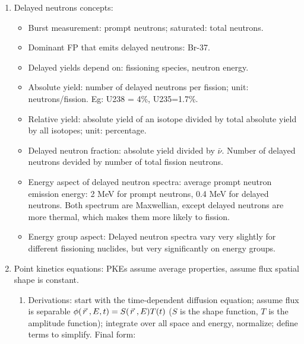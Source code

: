 \documentclass{school-22.211-notes}
\date{May 22, 2012}
\begin{document}
\maketitle


\begin{enumerate}
\item Delayed neutrons concepts: 
  \begin{itemize}
  \item Burst measurement: prompt neutrons; saturated: total neutrons. 
  \item Dominant FP that emits delayed neutrons: Br-37. 
  \item Delayed yields depend on: fissioning species, neutron energy.  
  \item Absolute yield: number of delayed neutrons per fission; unit: neutrons/fission. Eg: U238 = 4\%, U235=1.7\%. 
  \item Relative yield: absolute yield of an isotope divided by total absolute yield by all isotopes; unit: percentage. 
  \item Delayed neutron fraction: absolute yield divided by $\bar{\nu}$. Number of delayed neutrons devided by number of total fission neutrons. 
  \item Energy aspect of delayed neutron spectra: average prompt neutron emission energy: 2 MeV for prompt neutrons, 0.4 MeV for delayed neutrons. Both spectrum are Maxwellian, except delayed neutrons are more thermal, which makes them more likely to fission. 
  \item Energy group aspect: Delayed neutron spectra vary very slightly for different fissioning nuclides, but very significantly on energy groups. 
  \end{itemize}


\item Point kinetics equations: PKEs assume average properties, assume flux spatial shape is constant. 
  \begin{enumerate}
  \item Derivations: start with the time-dependent diffusion equation; assume flux is separable $\phi(\left.\vec{r}\right., E, t) = S(\left.\vec{r}\right., E) T(t)$ ($S$ is the shape function, $T$ is the amplitude function); integrate over all space and energy, normalize; define terms to simplify. Final form: 


\end{enumerate}
\end{enumerate}
\end{document}
